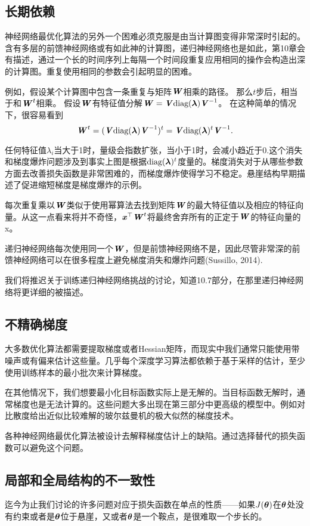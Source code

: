 \subsection{长期依赖}
神经网络最优化算法的另外一个困难必须克服是由当计算图变得非常深时引起的。含有多层的前馈神经网络或有如此神的计算图，递归神经网络也是如此，第10章会有描述，通过一个长的时间序列上每隔一个时间段重复应用相同的操作会构造出深的计算图。重复使用相同的参数会引起明显的困难。

例如，假设某个计算图中包含一条重复与矩阵$\boldsymbol{\mathit{W}}$相乘的路径。
那么$t$步后，相当于和$\boldsymbol{\mathit{W}}^t$相乘。
假设$\boldsymbol{\mathit{W}}$有特征值分解$\boldsymbol{\mathit{W}} = \boldsymbol{\mathit{V}} \text{diag}(\boldsymbol{\lambda}) \boldsymbol{\mathit{V}}^{-1}$。
在这种简单的情况下，很容易看到
\begin{equation}
  \boldsymbol{\mathit{W}}^t = (\boldsymbol{\mathit{V}} \text{diag}(\boldsymbol{\lambda}) \boldsymbol{\mathit{V}}^{-1})^t = \boldsymbol{\mathit{V}}\text{diag}(\boldsymbol{\lambda})^t  \boldsymbol{\mathit{V}}^{-1}.
\end{equation}

任何特征值$\lambda_i$当大于1时，量级会指数扩张，当小于1时，会减小趋近于0.这个消失和梯度爆炸问题涉及到事实上图是根据$\text{diag}(\boldsymbol{\lambda})^t$度量的。梯度消失对于从哪些参数方面去改善损失函数是非常困难的，而梯度爆炸使得学习不稳定。悬崖结构早期描述了促进缩短梯度是梯度爆炸的示例。

每次重复乘以$\boldsymbol{\mathit{W}}$类似于使用幂算法去找到矩阵$\boldsymbol{\mathit{W}}$的最大特征值以及相应的特征向量。从这一点看来将并不奇怪，$\boldsymbol{\mathit{x}}^\top\boldsymbol{\mathit{W}}^t$将最终舍弃所有的正定于$\boldsymbol{\mathit{W}}$的特征向量的x。

递归神经网络每次使用同一个$\boldsymbol{\mathit{W}}$，但是前馈神经网络不是，因此尽管非常深的前馈神经网络可以在很多程度上避免梯度消失和爆炸问题(Sussillo, 2014).

我们将推迟关于训练递归神经网络挑战的讨论，知道10.7部分，在那里递归神经网络将更详细的被描述。

\subsection{不精确梯度}
大多数优化算法都需要提取梯度或者Hessian矩阵，而现实中我们通常只能使用带噪声或有偏来估计这些量。几乎每个深度学习算法都依赖于基于采样的估计，至少使用训练样本的最小批次来计算梯度。

在其他情况下，我们想要最小化目标函数实际上是无解的。当目标函数无解时，通常梯度也是无法计算的。这些问题大多出现在第三部分中更高级的模型中。例如对比散度给出近似比较难解的玻尔兹曼机的极大似然的梯度技术。

各种神经网络最优化算法被设计去解释梯度估计上的缺陷。通过选择替代的损失函数可以避免这个问题。

\subsection{局部和全局结构的不一致性}
迄今为止我们讨论的许多问题对应于损失函数在单点的性质——如果$J(\boldsymbol{\theta})$在$\boldsymbol{\theta}$处没有约束或者是$\boldsymbol{\theta}$位于悬崖，又或者$\boldsymbol{\theta}$是一个鞍点，是很难取一个步长的。

